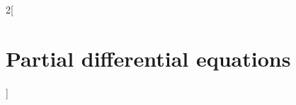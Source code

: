 \documentclass[../../../main.tex]{subfiles}
\begin{document}
\renewcommand{\col}{\apl}
\begin{multicols}{2}[\section{Partial differential equations}]

\end{multicols}
\end{document}
